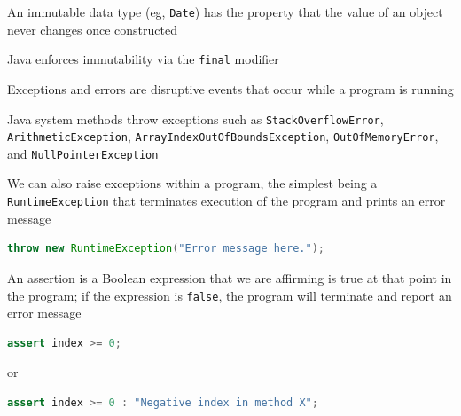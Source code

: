 \documentclass[8pt,a4paper,compress]{beamer}
\begin{document}
\begin{frame}[fragile]
An immutable data type (eg, \lstinline{Date}) has the property that the value of an object never changes once constructed

\bigskip

Java enforces immutability via the \lstinline{final} modifier

\bigskip

Exceptions and errors are disruptive events that occur while a program is running

\bigskip

Java system methods throw exceptions such as  \lstinline{StackOverflowError}, \lstinline{ArithmeticException}, \lstinline{ArrayIndexOutOfBoundsException}, \lstinline{OutOfMemoryError}, and \lstinline{NullPointerException}

\bigskip

We can also raise exceptions within a program, the simplest being a \lstinline{RuntimeException} that terminates execution of the program and prints an error message
\begin{lstlisting}[language=Java]
throw new RuntimeException("Error message here.");
\end{lstlisting}

\bigskip

An assertion is a Boolean expression that we are affirming is true at that point in the program; if the expression is \lstinline{false}, the program will terminate and report an error message
\begin{lstlisting}[language=Java]
assert index >= 0;
\end{lstlisting}
or
\begin{lstlisting}[language=Java]
assert index >= 0 : "Negative index in method X";
\end{lstlisting}
\end{frame}
\end{document}
